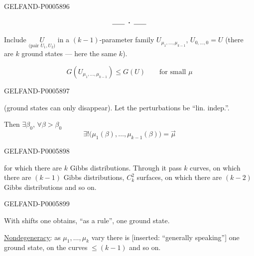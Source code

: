 \begin{GelfandAdjacentEvidence}{GELFAND-P000589}{6}


\[
\rule{1.8em}{.4pt}\;\boldsymbol{\cdot}\;\rule{1.8em}{.4pt}
\]

Include \(\underset{\text{(pair $U_1,U_2$)}}{U}\)
in a \((k-1)\)-parameter family
\(U_{\mu_1,\ldots,\mu_{k-1}}\), \(U_{0,\ldots,0}=U\)
(there are \(k\) ground states — here the same \(k\)).

\[
G(U_{\mu_1,\ldots,\mu_{k-1}})\le G(U)\qquad \text{for small }\mu
\]
\end{GelfandAdjacentEvidence}
\begin{GelfandAdjacentEvidence}{GELFAND-P000589}{7}

(ground states can only disappear). Let the perturbations be “lin. indep.”.

Then \(\exists\beta_0\), \(\forall\beta>\beta_0\)
\[
\exists!\bigl(\mu_1(\beta),\ldots,\mu_{k-1}(\beta)\bigr)=\vec\mu
\]
\end{GelfandAdjacentEvidence}
\begin{GelfandAdjacentEvidence}{GELFAND-P000589}{8}

for which there are \(k\) Gibbs distributions. Through it pass \(k\) curves,
on which there are \((k-1)\) Gibbs distributions, \(C_k^2\) surfaces,
on which there are \((k-2)\) Gibbs distributions and so on.
\end{GelfandAdjacentEvidence}
\begin{GelfandAdjacentEvidence}{GELFAND-P000589}{9}


With shifts one obtains, “as a rule”, one ground state.

\underline{\underline{Nondegeneracy}}:
as \(\mu_1,\ldots,\mu_k\) vary there is
[inserted: “generally speaking”] one ground state, on the curves \(\le(k-1)\) and so on.
\end{GelfandAdjacentEvidence}

